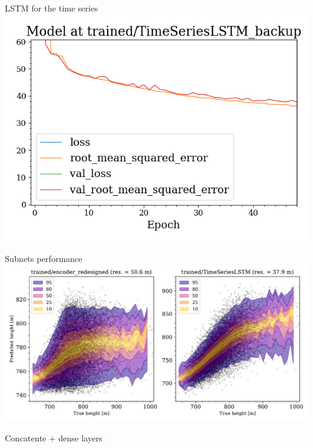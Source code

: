 \documentclass{beamer}
\begin{document}
\begin{frame}{LSTM for the time series}
    \includegraphics[width=\textwidth]{figures/LSTM_history.png}    
\end{frame}

\begin{frame}{Subnets performance}
    \includegraphics[width=\textwidth]{figures/sub_net_train.pdf}
\end{frame}

\begin{frame}{Concatente + dense layers}

    
\end{frame}
\end{document}
